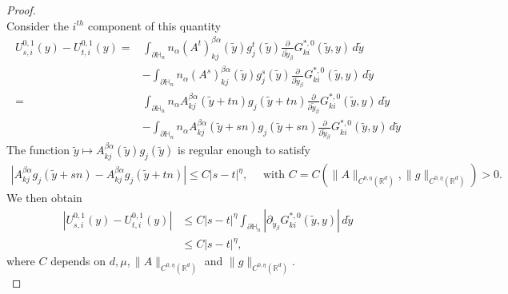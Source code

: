 \documentclass[11pt, reqno]{amsart}
\theoremstyle{definition}
\theoremstyle{remark}
\numberwithin{equation}{section}
\begin{document}
\begin{proof}[Proof]
		
		\\
		Consider the  $i^{th}$ component of this quantity
		\begin{align*}
			U^{0,1}_{s,i}(y)- 	U^{0,1}_{t,i}(y) 
			=&
			\int_{\partial\mathbb{H}_n} 
			n_\alpha (A^t)^{\beta\alpha}_{kj}(\tilde{y})g^t_j(\tilde{y})\frac{\partial}{\partial \tilde{y}_\beta} G^{*,0}_{ki} \left(\tilde{y},y \right)\,d\tilde{y} \\
			&	- \int_{\partial\mathbb{H}_n} 
			n_\alpha (A^s)^{\beta\alpha}_{kj}(\tilde{y})g^s_j(\tilde{y})\frac{\partial}{\partial \tilde{y}_\beta} G^{*,0}_{ki} \left(\tilde{y},y \right)\,d\tilde{y} \\
			=& \int_{\partial\mathbb{H}_n} 
			n_\alpha A^{\beta\alpha}_{kj}(\tilde{y}+tn)g_j(\tilde{y}+tn)\frac{\partial}{\partial \tilde{y}_\beta} G^{*,0}_{ki} \left(\tilde{y},y \right)\,d\tilde{y} \\
			&	- \int_{\partial\mathbb{H}_n} 
			n_\alpha A^{\beta\alpha}_{kj}(\tilde{y}+sn)g_j(\tilde{y}+sn)\frac{\partial}{\partial \tilde{y}_\beta} G^{*,0}_{ki} \left(\tilde{y},y \right)
			\,d\tilde{y} 
		\end{align*}
		The function $\tilde{y}\mapsto A^{\beta\alpha}_{kj}(\tilde{y})g_j(\tilde{y})$ is regular enough to satisfy \begin{align*}
			|A^{\beta\alpha}_{kj}g_j(\tilde{y}+sn)- A^{\beta\alpha}_{kj}g_j(\tilde{y}+tn)|\leq C |s-t|^\eta, \quad \mbox{ with } C=C(\|A\|_{C^{0,\eta}(\mathbb{R}^d)}, \|g\|_{C^{0,\eta}(\mathbb{R}^d)})>0.
		\end{align*}We then obtain
		\begin{align*}
			|	U^{0,1}_{s,i}(y)- 	U^{0,1}_{t,i}(y) |
			&\leq  C |s-t|^\eta\int_{\partial\mathbb{H}_n} 
			|	\partial_{\tilde{y}_\beta} G^{*,0}_{ki} \left(\tilde{y},y \right)|\,d\tilde{y}\\ &\leq C |s-t|^\eta,
		\end{align*}
	where $C$ depends on $d, \mu, \|A\|_{C^{0,\eta}(\mathbb{R}^d)}$ and $\|g\|_{C^{0,\eta}(\mathbb{R}^d)}.$\\
	

\end{proof}
\end{document}

